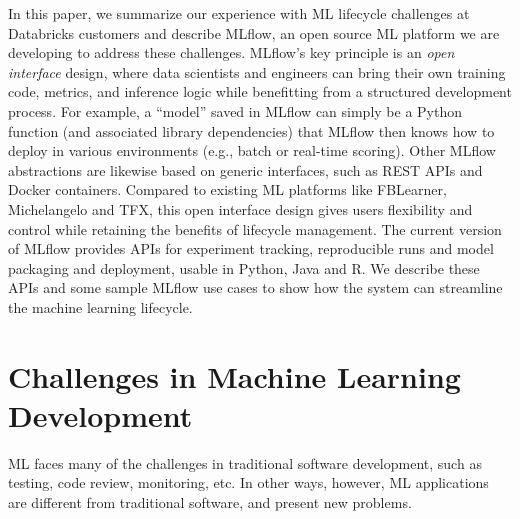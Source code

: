 \documentclass[11pt]{article}
\begin{document}

In this paper, we summarize our experience with ML lifecycle challenges at Databricks customers and describe MLflow, an open source ML platform we are developing to address these challenges.
MLflow's key principle is an \emph{open interface} design, where data scientists and engineers can bring their own training code, metrics, and inference logic while benefitting from a structured development process.
For example, a ``model'' saved in MLflow can simply be a Python function (and associated library dependencies) that MLflow then knows how to deploy in various environments (e.g., batch or real-time scoring).
Other MLflow abstractions are likewise based on generic interfaces, such as REST APIs and Docker containers.
Compared to existing ML platforms like FBLearner, Michelangelo and TFX, this open interface design gives users flexibility and control while retaining the benefits of lifecycle management.
The current version of MLflow provides APIs for experiment tracking, reproducible runs and model packaging and deployment, usable in Python, Java and R.
We describe these APIs and some sample MLflow use cases to show how the system can streamline the machine learning lifecycle.

\section{Challenges in Machine Learning Development}

ML faces many of the challenges in traditional software development, such as testing, code review, monitoring, etc.
In other ways, however, ML applications are different from traditional software, and present new problems.
\end{document}
